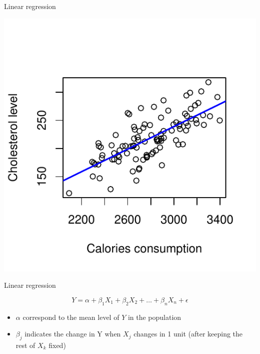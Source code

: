 \documentclass[10pt,xcolor=dvipsnames]{beamer}\usepackage[]{graphicx}\usepackage[]{color}
\makeatletter
\def\maxwidth{ %
  \ifdim\Gin@nat@width>\linewidth
    \linewidth
  \else
    \Gin@nat@width
  \fi
}
\newenvironment{knitrout}{}{} %
\makeatother
\begin{document}
\begin{frame}[fragile]{Linear regression}

\begin{knitrout}
\color{fgcolor}
\includegraphics[width=\maxwidth]{figure/lm-1} 

\end{knitrout}
\end{frame}


\begin{frame}{Linear regression}

$$ Y = \alpha + \beta_1 X_1 + \beta_2 X_2 + \ldots + \beta_n X_n + \epsilon $$

\begin{itemize}
\item $\alpha$ correspond to the mean level of $Y$ in the population
\item $\beta_j$ indicates the change in Y when $X_j$ changes in 1 unit (after keeping the rest of $X_k$ fixed) 
\end{itemize}

\end{frame}
\end{document}
